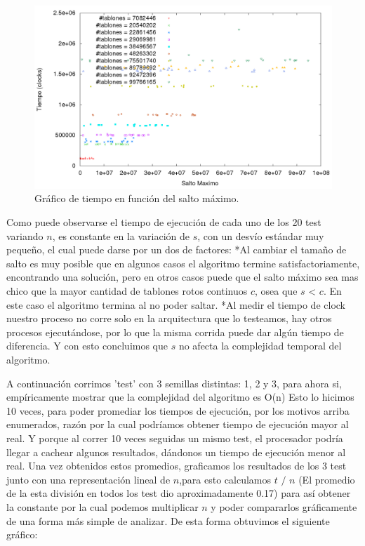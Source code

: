 \begin{figure}[h]
\begin{center}
\includegraphics[scale=1]{./imagenes/ej1_testSaltoMaximo.png}
\caption{Gr\'afico de tiempo en funci\'on del salto m\'aximo.}
\end{center}
\end{figure}


Como puede observarse el tiempo de ejecución de cada uno de los 20 test variando $n$, es constante en la variación de $s$, con un desvío estándar muy pequeño, el cual puede darse por un dos de factores: 
*Al cambiar el tamaño de salto es muy posible que en algunos casos el algoritmo termine satisfactoriamente, encontrando una solución, pero en otros casos puede que el salto máximo sea mas chico que la mayor cantidad de tablones rotos continuos $c$, osea que $s$ < $c$. En este caso el algoritmo termina al no poder saltar.
*Al medir el tiempo de clock nuestro proceso no corre solo en la arquitectura que lo testeamos, hay otros procesos ejecutándose, por lo que la misma corrida puede dar algún tiempo de diferencia.
Y con esto concluimos que $s$ no afecta la complejidad temporal del algoritmo.

A continuación corrimos 'test' con 3 semillas distintas: 1, 2 y 3, para ahora si, empíricamente mostrar que la complejidad del algoritmo es O(n)
Esto lo hicimos 10 veces, para poder promediar los tiempos de ejecución, por los motivos arriba enumerados, razón por la cual podríamos obtener tiempo de ejecución mayor al real. Y porque al correr 10 veces seguidas un mismo test, el procesador podría llegar a cachear algunos resultados, dándonos un tiempo de ejecución menor al real.
Una vez obtenidos estos promedios, graficamos los resultados de los 3 test junto con una representación lineal de $n$,para esto calculamos $t$ $/$ $n$ (El promedio de la esta división en todos los test dio aproximadamente 0.17) para así obtener la constante por la cual podemos multiplicar $n$ y poder compararlos gráficamente de una forma más simple de analizar.  De esta forma obtuvimos el siguiente gráfico:

